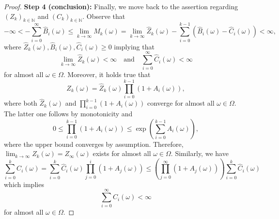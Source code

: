 \documentclass[12pt,openany]{book}
\theoremstyle{definition}
\theoremstyle{definition}
\newcommand{\N}{\mathbb{N}}
\begin{document}
\begin{proof}
\textbf{Step 4 (conclusion):} Finally, we move back to the assertion regarding $(Z_k)_{k\in\N}$ and $(C_k)_{k\in\N}$. Observe that
\[-\infty < - \sum_{i=0}^\infty \widehat B_i(\omega) \le \lim_{k\to\infty} M_k(\omega) = \lim_{k\to\infty} \widehat Z_k(\omega) - \sum_{i=0}^{k-1}(\widehat B_i(\omega)- \widehat C_i(\omega)) <\infty, \]
where $\widehat Z_k(\omega), \widehat B_i(\omega), \widehat C_i(\omega) \ge 0$ implying that
\[\lim_{k\to\infty} \widehat Z_k(\omega) <\infty \quad \text{and}\quad \sum_{i=0}^\infty \widehat C_i(\omega) <\infty \]
for almost all $\omega\in\Omega$.
Moreover, it holds true that
\[Z_k(\omega) = \widehat Z_k(\omega) \prod_{i=0}^{k-1} (1+A_i(\omega)),\]
where both $\widehat Z_k(\omega)$ and $\prod_{i=0}^{k-1} (1+A_i(\omega))$ converge for almost all $\omega\in\Omega$. The latter one follows by monotonicity and
\[ 0 \le \prod_{i=0}^{k-1} (1+A_i(\omega)) \le \exp(\sum_{i=0}^{k-1} A_i(\omega)), \]
where the upper bound converges by assumption. Therefore, $\lim_{k\to\infty} Z_k(\omega) = Z_\infty(\omega)$ exists for almost all $\omega\in\Omega$. Similarly, we have
\[\sum_{i=0}^k C_i(\omega) = \sum_{i=0}^k \widehat C_i(\omega) \prod_{j=0}^i (1+A_j(\omega)) \le \left(\prod_{j=0}^\infty (1+A_j(\omega))\right) \sum_{i=0}^k \widehat C_i(\omega) \]
which implies
\[\sum_{i=0}^\infty C_i(\omega) <\infty \]
for almost all $\omega\in\Omega$. 
\end{proof}
\end{document}
